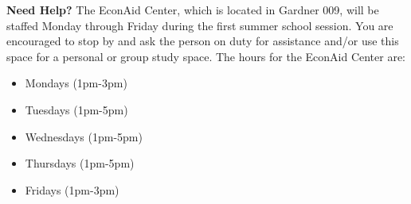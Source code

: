 \documentclass[11pt]{article}
\begin{document}
\textbf{Need Help?} The EconAid Center, which is located in Gardner 009, will be staffed Monday through Friday during the first summer school session.  You are encouraged to stop by and ask the person on duty for assistance and/or use this space for a personal or group study space. The hours for the EconAid Center are:
\begin{itemize}
	\item Mondays (1pm-3pm)
	\item Tuesdays (1pm-5pm)     
	\item Wednesdays (1pm-5pm)
	\item Thursdays (1pm-5pm)
	\item Fridays (1pm-3pm)
\end{itemize} 

     


\newpage
\end{document}
